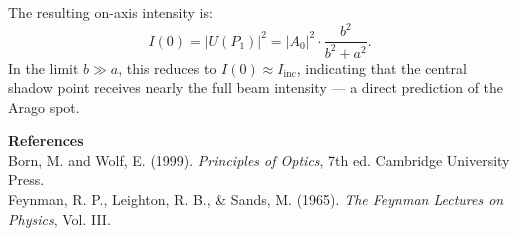 \begin{technical}
The resulting on-axis intensity is:
\[
I(0) = |U(P_1)|^2 = |A_0|^2 \cdot \frac{b^2}{b^2 + a^2}.
\]
In the limit $b \gg a$, this reduces to $I(0) \approx I_{\text{inc}}$, indicating that the central shadow point receives nearly the full beam intensity — a direct prediction of the Arago spot.

\vspace{0.5em}
\noindent\textbf{References}\\
Born, M. and Wolf, E. (1999). \textit{Principles of Optics}, 7th ed. Cambridge University Press.\\
Feynman, R. P., Leighton, R. B., \& Sands, M. (1965). \textit{The Feynman Lectures on Physics}, Vol. III.
\end{technical}
